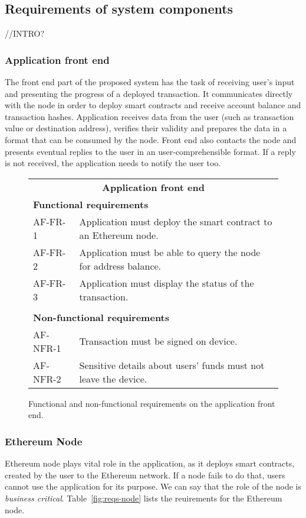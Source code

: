 \subsection{Requirements of system components}

//INTRO?

\subsubsection{Application front end}
The front end part of the proposed system has the task of receiving user's input and presenting the progress of a deployed transaction. It communicates directly with the node in order to deploy smart contracts and receive account balance and transaction hashes. Application receives data from the user (such as transaction value or destination address), verifies their validity and prepares the data in a format that can be consumed by the node. Front end also contacts the node and presents eventual replies to the user in an user-comprehensible format. If a reply is not received, the application needs to notify the user too.

\begin{figure}[ht]
    \begin{tabularx}{\textwidth}{|l X|}
    \hline
        \multicolumn{2}{|c|}{\textbf{Application front end}}\\
        \multicolumn{2}{|l|}{\textbf{Functional requirements}}\\
        AF-FR-1&Application must deploy the smart contract to an Ethereum node.\\
        AF-FR-2&Application must be able to query the node for address balance.\\
        AF-FR-3&Application must display the status of the transaction.\\
        &\\
        \multicolumn{2}{|l|}{\textbf{Non-functional requirements}}\\
        AF-NFR-1&Transaction must be signed on device.\\
        AF-NFR-2&Sensitive details about users' funds must not leave the device.\\
    \hline
    \end{tabularx}
   
    \caption{Functional and non-functional requirements on the application front end.}
    \label{fig:reqa-applicaion}
\end{figure}

\subsubsection{Ethereum Node}
Ethereum node plays vital role in the application, as it deploys smart contracts, created by the user to the Ethereum network. If a node fails to do that, users cannot use the application for its purpose. We can say that the role of the node is \textit{business critical}. Table~\ref{fig:reqs-node} lists the reuirements for the Ethereum node.

